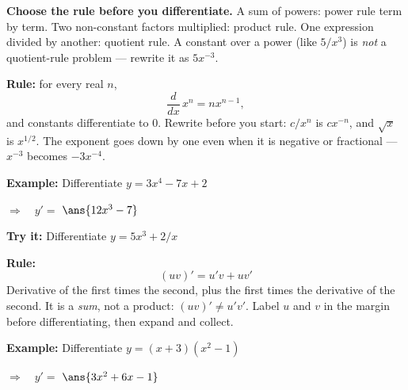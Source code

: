 \documentclass[12pt]{article}
\begin{document}

\begin{formulabox}
\textbf{Choose the rule before you differentiate.} A sum of powers: power rule
term by term. Two non-constant factors multiplied: product rule. One expression
divided by another: quotient rule. A constant over a power (like $5/x^3$) is
\emph{not} a quotient-rule problem --- rewrite it as $5x^{-3}$.
\end{formulabox}


\begin{formulabox}
\textbf{Rule:} for every real $n$,
\[
  \frac{d}{dx}\,x^n = nx^{n-1},
\]
and constants differentiate to $0$. Rewrite before you start: $c/x^n$ is
$cx^{-n}$, and $\sqrt{x}$ is $x^{1/2}$. The exponent goes down by one even when
it is negative or fractional --- $x^{-3}$ becomes $-3x^{-4}$.
\end{formulabox}

\begin{examplebox}
\textbf{Example:} \quad Differentiate $y = 3x^4 - 7x + 2$

$\Rightarrow\quad y' = $ $\ans{12x^3 - 7}$
\end{examplebox}

\begin{tryitbox}
\textbf{Try it:} \quad Differentiate $y = 5x^3 + 2/x$\\[2pt]
\end{tryitbox}


\begin{formulabox}
\textbf{Rule:}
\[
  (uv)' = u'v + uv'
\]
Derivative of the first times the second, plus the first times the derivative of
the second. It is a \emph{sum}, not a product: $(uv)' \neq u'v'$. Label $u$ and
$v$ in the margin before differentiating, then expand and collect.
\end{formulabox}

\begin{examplebox}
\textbf{Example:} \quad Differentiate $y = (x+3)\left(x^2-1\right)$

$\Rightarrow\quad y' = $ $\ans{3x^2 + 6x - 1}$
\end{examplebox}
\end{document}
